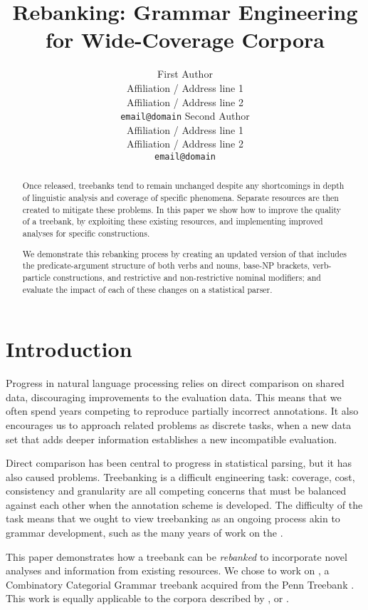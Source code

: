 \documentclass[11pt]{article}
\title{Rebanking: Grammar Engineering for Wide-Coverage Corpora}
\author{First Author\\
  Affiliation / Address line 1\\
  Affiliation / Address line 2\\
  {\tt email@domain}  \And
  Second Author\\
  Affiliation / Address line 1\\
  Affiliation / Address line 2\\
  {\tt  email@domain}}
\date{}
\begin{document}
\maketitle
\begin{abstract}
Once released, treebanks tend to remain unchanged despite any shortcomings
in depth of linguistic analysis and coverage of specific
phenomena. Separate resources are then created to mitigate these problems.
In this paper we show how to improve the quality of a
treebank, by exploiting these existing resources, and
implementing improved analyses for specific constructions.

We demonstrate this rebanking process by creating an updated version of \ccgbank that
includes the  predicate-argument structure of both verbs and nouns,
base-NP brackets, verb-particle constructions,
and restrictive and non-restrictive nominal modifiers; and evaluate
the impact of each of these changes on a statistical parser.

\end{abstract}

\section{Introduction}

Progress in natural language processing relies on direct comparison
on shared data, discouraging improvements to the evaluation data. This means
that we often spend years competing to reproduce partially incorrect
annotations. It also encourages us to approach related problems as discrete
tasks, when a new data set that adds deeper information establishes a new
incompatible evaluation.

Direct comparison has been central to progress in statistical parsing, but it
has also caused problems. Treebanking is a difficult engineering task: coverage,
cost, consistency and granularity are all competing concerns that must be
balanced against each other when the annotation scheme is developed. The difficulty
of the task means that we ought to view treebanking as an ongoing process akin to grammar
development, such as the many years of work on the \erg \citep{erg}.

This paper demonstrates how a treebank can be \emph{rebanked} to incorporate 
novel analyses and information from existing resources. We chose to work
on \ccgbank \citep{hock:cl07}, a Combinatory Categorial Grammar \citep{steedman:00}
treebank acquired from the Penn Treebank \citep{marcus:93}. This work is
equally applicable to the corpora described by \citet{miyao:04}, \citet{shen:08}
or \citet{cahill:08}. 
\end{document}
